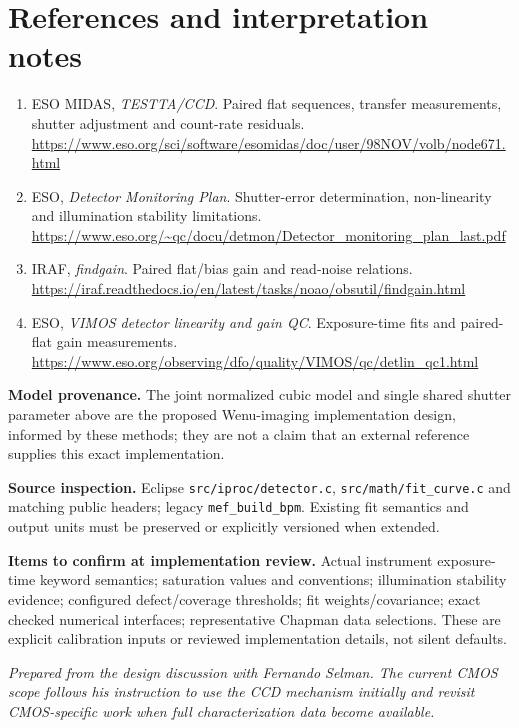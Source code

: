 \documentclass[11pt,a4paper]{article}
\newcommand{\key}[1]{\textbf{\color{ink}#1}}
\newcommand{\nextpage}{\clearpage}
\begin{document}
\nextpage
\section{References and interpretation notes}
\begin{enumerate}
\item ESO MIDAS, \textit{TESTTA/CCD}. Paired flat sequences, transfer measurements, shutter adjustment and count-rate residuals.\\\url{https://www.eso.org/sci/software/esomidas/doc/user/98NOV/volb/node671.html}
\item ESO, \textit{Detector Monitoring Plan}. Shutter-error determination, non-linearity and illumination stability limitations.\\\url{https://www.eso.org/~qc/docu/detmon/Detector_monitoring_plan_last.pdf}
\item IRAF, \textit{findgain}. Paired flat/bias gain and read-noise relations.\\\url{https://iraf.readthedocs.io/en/latest/tasks/noao/obsutil/findgain.html}
\item ESO, \textit{VIMOS detector linearity and gain QC}. Exposure-time fits and paired-flat gain measurements.\\\url{https://www.eso.org/observing/dfo/quality/VIMOS/qc/detlin_qc1.html}
\end{enumerate}

\key{Model provenance.} The joint normalized cubic model and single shared shutter parameter above are the proposed Wenu-imaging implementation design, informed by these methods; they are not a claim that an external reference supplies this exact implementation.

\key{Source inspection.} Eclipse \texttt{src/iproc/detector.c}, \texttt{src/math/fit\_curve.c} and matching public headers; legacy \texttt{mef\_build\_bpm}. Existing fit semantics and output units must be preserved or explicitly versioned when extended.

\key{Items to confirm at implementation review.} Actual instrument exposure-time keyword semantics; saturation values and conventions; illumination stability evidence; configured defect/coverage thresholds; fit weights/covariance; exact checked numerical interfaces; representative Chapman data selections. These are explicit calibration inputs or reviewed implementation details, not silent defaults.

\vfill
\textit{Prepared from the design discussion with Fernando Selman. The current CMOS scope follows his instruction to use the CCD mechanism initially and revisit CMOS-specific work when full characterization data become available.}
\end{document}
